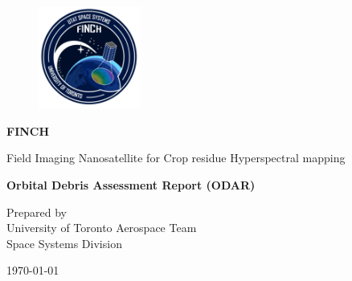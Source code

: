 \begin{titlepage}
    \begin{center}
        \vspace*{1cm}

        \begin{figure}[H]
            \centering
            \includegraphics[width=0.3\textwidth]{figures/logos/finch.png}
        \end{figure}

        {\Huge\textbf{FINCH}}

        \bigskip
        \bigskip

        {\LARGE Field Imaging Nanosatellite for Crop residue Hyperspectral mapping}

        \bigskip
        \bigskip
        \bigskip
        \bigskip
        \bigskip
        \bigskip

        {\Large\textbf{Orbital Debris Assessment Report (ODAR)} \\}

        \vfill


        {\normalsize Prepared by \\
            University of Toronto Aerospace Team \\
            Space Systems Division \\}

        \bigskip
        \bigskip
        \bigskip

        {\Large \today}


        
        \begin{figure}[H]
            \centering
            
            \label{fig:logo}
        \end{figure}

    \end{center}
\end{titlepage}